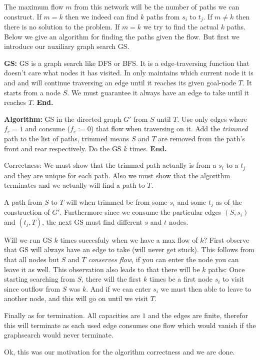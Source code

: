 \documentclass[a4paper,11pt]{article}
\begin{document}
The maximum flow $m$ from this network will be the number
of paths we can construct. If $m=k$ then we indeed can
find $k$ paths from $s_i$ to $t_j$.
If $m \neq k$ then there is no solution to the problem.
If $m=k$ we try to find the actual $k$ paths.
Below we give an algorithm for finding the paths given the
flow. But first we introduce our auxiliary graph search GS.

\textbf{GS: }
GS is a graph search like DFS or BFS. It is a edge-traversing
function that doesn't care what nodes it has visited.
In only maintains which current node it is and and will
continue traversing an edge until it reaches its given goal-node $T$.
It starts from a node $S$.
We must guarantee it always have an edge to take until it
reaches $T$.
\textbf{End.}

\textbf{Algorithm: }
GS in the directed graph $G'$ from $S$ until $T$.
Use only edges where
$f_e=1$ and consume ($f_e:=0$) that flow when traversing on it.
Add the \emph{trimmed} path to the list of paths,
trimmed means $S$ and $T$ are removed from the path's
front and rear respectively.
Do the GS $k$ times.
\textbf{End.}

Correctness: We must show that the trimmed path actually is from
a $s_i$ to a $t_j$ and they are unique for each path.
Also we must show that the algorithm terminates and we actually
will find a path to $T$.

A path from $S$ to $T$
will when trimmed be from some $s_i$ and some $t_j$
as of the construction of $G'$.
Furthermore since we consume the particular edges
$(S, s_i)$ and $(t_j, T)$, the next GS must find
different $s$ and $t$ nodes.

Will we run GS $k$ times succesfuly when we have a max flow of $k$?
First observe that GS will always have an edge to take (will never get stuck).
This follows from that all nodes
but $S$ and $T$ \emph{conserves flow}, if you can enter
the node you can leave it as well. This observation also leads to
that there will be $k$ paths:
Once starting searching from $S$, there will the first $k$ times
be a first node $s_i$ to visit since outflow from $S$ was $k$.
And if we can enter $s_i$ we must then able to leave to another
node, and this will go on until we visit $T$.

Finally as for termination. All capacities are $1$ and the
edges are finite, therefor this will terminate as each used edge
consumes one flow which would vanish if the graphsearch would
never terminate.

Ok, this was our motivation for the algorithm correctness and we are done.
\end{document}
